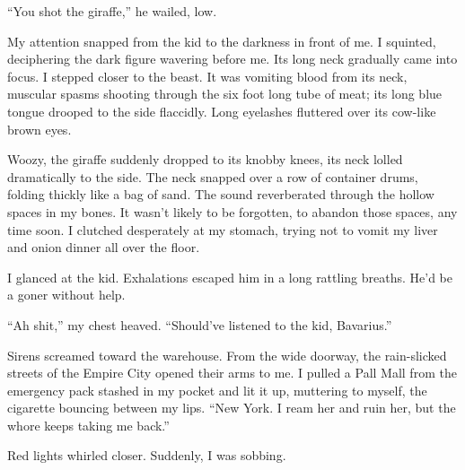 ``You shot the giraffe,'' he wailed, low.



My attention snapped from the kid to the darkness in front of me. I
squinted, deciphering the dark figure wavering before me. Its long
neck gradually came into focus. I stepped closer to the beast. It
was vomiting blood from its neck, muscular spasms shooting through
the six foot long tube of meat; its long blue tongue drooped to the
side flaccidly. Long eyelashes fluttered over its cow-like brown
eyes.



Woozy, the giraffe suddenly dropped to its knobby knees, its neck
lolled dramatically to the side. The neck snapped over a row of
container drums, folding thickly like a bag of sand. The sound
reverberated through the hollow spaces in my bones. It wasn't
likely to be forgotten, to abandon those spaces, any time soon. I
clutched desperately at my stomach, trying not to vomit my liver
and onion dinner all over the floor.



I glanced at the kid. Exhalations escaped him in a long rattling
breaths. He'd be a goner without help.



``Ah shit,'' my chest heaved. ``Should've listened
to the kid, Bavarius.''



Sirens screamed toward the warehouse. From the wide doorway, the
rain-slicked streets of the Empire City opened their arms to me. I
pulled a Pall Mall from the emergency pack stashed in my pocket and
lit it up, muttering to myself, the cigarette bouncing between my
lips. ``New York. I ream her and ruin her, but the whore keeps
taking me back.''



Red lights whirled closer. Suddenly, I was sobbing. 

 



